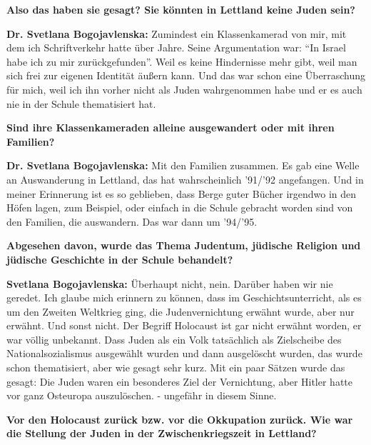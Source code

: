 \textbf{Also das haben sie gesagt? Sie könnten in Lettland keine Juden sein?}

\textbf{Dr. Svetlana Bogojavlenska:} Zumindest ein Klassenkamerad von mir, mit dem ich Schriftverkehr hatte über Jahre. Seine Argumentation war: "`In Israel habe ich zu mir zurückgefunden"'. Weil es keine Hindernisse mehr gibt, weil man sich frei zur eigenen Identität äußern kann. Und das war schon eine Überraschung für mich, weil ich ihn vorher nicht als Juden wahrgenommen habe und er es auch nie in der Schule thematisiert hat.

\textbf{Sind ihre Klassenkameraden alleine ausgewandert oder mit ihren Familien?}

\textbf{Dr. Svetlana Bogojavlenska:} Mit den Familien zusammen. Es gab eine Welle an Auswanderung in Lettland, das hat wahrscheinlich '91/'92 angefangen. Und in meiner Erinnerung ist es so geblieben, dass Berge guter Bücher irgendwo in den Höfen lagen, zum Beispiel, oder einfach in die Schule gebracht worden sind von den Familien, die auswandern.  Das war dann um '94/'95.

\textbf{Abgesehen davon, wurde das Thema Judentum, jüdische Religion und jüdische Geschichte in der Schule behandelt?}

\textbf{Svetlana Bogojavlenska:} Überhaupt nicht, nein. Darüber haben wir nie geredet. Ich glaube mich erinnern zu können, dass im Geschichtsunterricht, als es um den Zweiten Weltkrieg ging, die Judenvernichtung erwähnt wurde, aber nur erwähnt. Und sonst nicht. Der Begriff Holocaust ist gar nicht erwähnt worden, er war völlig unbekannt. Dass Juden als ein Volk tatsächlich als Zielscheibe des Nationalsozialismus ausgewählt wurden und dann ausgelöscht wurden, das wurde schon thematisiert, aber wie gesagt sehr kurz. Mit ein paar Sätzen wurde das gesagt: Die Juden waren ein besonderes Ziel der Vernichtung, aber Hitler hatte vor ganz Osteuropa auszulöschen. - ungefähr in diesem Sinne.

\textbf{Vor den Holocaust zurück bzw. vor die Okkupation zurück. Wie war die Stellung der Juden in der Zwischenkriegszeit in Lettland?}

